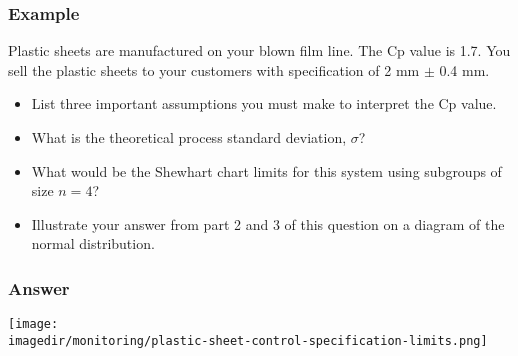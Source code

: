\begin{frame}\frametitle{Example}

	Plastic sheets are manufactured on your blown film line. The Cp value is 1.7. You sell the plastic sheets to your customers with specification of 2 mm $\pm$ 0.4 mm.
	\begin{itemize}
		\item	List three important assumptions you must make to interpret the Cp value.
		\item	What is the theoretical process standard deviation, $\sigma$?
		\item	What would be the Shewhart chart limits for this system using subgroups of size $n=4$?
		\item	Illustrate your answer from part 2 and 3 of this question on a diagram of the normal distribution.
	\end{itemize}
\end{frame}

\begin{frame}\frametitle{Answer}
	\texttt{[image: \\imagedir/monitoring/plastic-sheet-control-specification-limits.png]}
\end{frame}

